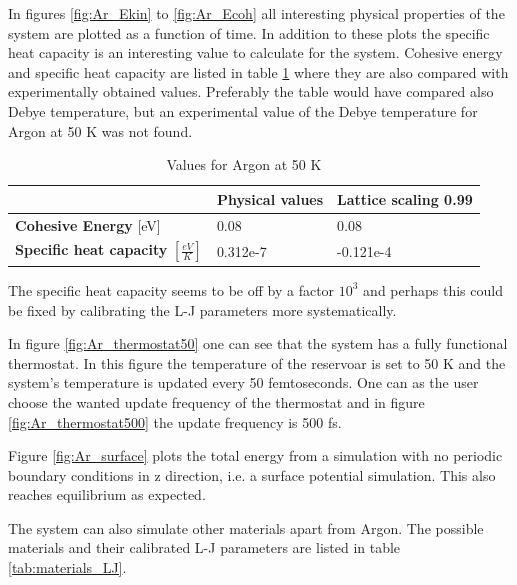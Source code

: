 \documentclass[12pt,a4paper]{article}
\begin{document}
In figures \ref{fig:Ar_Ekin} to \ref{fig:Ar_Ecoh} all interesting physical properties of the system are plotted as a function of time. In addition to these plots the specific heat capacity is an interesting value to calculate for the system. Cohesive energy and specific heat capacity are listed in table \ref{tab:Ar_comparison} where they are also compared with experimentally obtained values. Preferably the table would have compared also Debye temperature, but an experimental value of the Debye temperature for Argon at 50 K was not found.

\begin{table}[h]
\begin{center}
\caption{Values for Argon at 50 K}
\label{tab:Ar_comparison}
\begin{tabular}{| p{} | p{} | p{} |}
\hline
  & \textbf{Physical values} & \textbf{Lattice scaling 0.99} \\
\hline
\textbf{Cohesive Energy} [eV] & 0.08  & 0.08 \\
\hline
\textbf{Specific heat capacity}  \( \left[ \frac{eV}{K}  \right] \) & 0.312e-7 & -0.121e-4 \\
\hline
\end{tabular}
\end{center}
\end{table}

The specific heat capacity seems to be off by a factor \(10^3\) and perhaps this could be fixed by calibrating the L-J parameters more systematically.

In figure \ref{fig:Ar_thermostat50} one can see that the system has a fully functional thermostat. In this figure the temperature of the reservoar is set to 50 K and the system's temperature is updated every 50 femtoseconds. One can as the user choose the wanted update frequency of the thermostat and in figure \ref{fig:Ar_thermostat500} the update frequency is 500 fs.

Figure \ref{fig:Ar_surface} plots the total energy from a simulation with no periodic boundary conditions in z direction, i.e. a surface potential simulation. This also reaches equilibrium as expected.

The system can also simulate other materials apart from Argon. The possible materials and their calibrated L-J parameters are listed in table \ref{tab:materials_LJ}.
\end{document}
